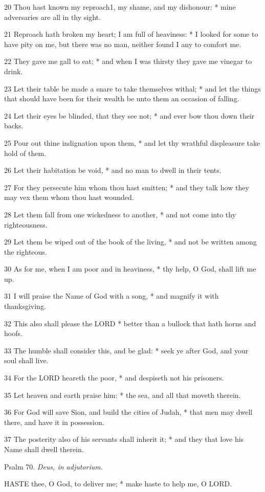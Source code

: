20 Thou hast known my reproach1, my shame, and my dishonour:
* mine adversaries are all in thy sight.

21 Reproach hath broken my heart; I am full of heaviness:
* I looked for some to have pity on me, but there was no man, neither
found I any to comfort me.

22 They gave me gall to eat; * and when I was thirsty
they gave me vinegar to drink.

23
Let their table be made a snare to take themselves withal; * and let the
things that should have been for their wealth be unto them an occasion
of falling.

24 Let their eyes be blinded, that they see not; *
and ever bow thou down their backs.

25 Pour out thine indignation upon them, * and let
thy wrathful displeasure take hold of them.

26 Let their habitation be void, * and no man to dwell
in their tents.

27 For they persecute him whom thou hast smitten; *
and they talk how they may vex them whom thou hast wounded.

28 Let them fall from one wickedness to another, *
and not come into thy righteousness.

29 Let them be wiped out of the book of the living,
* and not be written among the righteous.

30 As for me, when I am poor and in heaviness, * thy
help, O God, shall lift me up.

31 I will praise the Name of God with a song, * and
magnify it with thanksgiving.

32 This also shall please the LORD
* better than a bullock that hath horns and hoofs.

33 The humble shall consider this, and be glad: * seek
ye after God, and your soul shall live.

34 For the LORD heareth the
poor, * and despiseth not his prisoners.

35 Let heaven and earth praise him: * the sea, and
all that moveth therein.

36 For God will save Sion, and build the cities of
Judah, * that men may dwell there, and have it in possession.

37 The posterity also of his servants shall inherit
it; * and they that love his Name shall dwell therein.

Psalm
70. \emph{Deus, in adjutorium.}

HASTE
thee, O God, to deliver me; * make haste to help me, O LORD.

